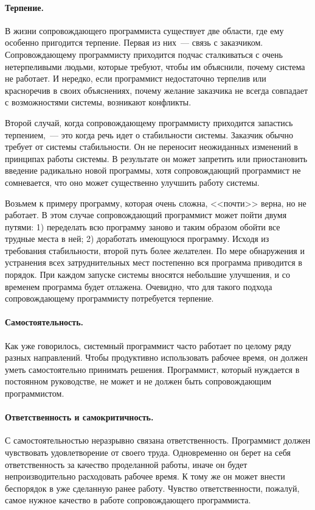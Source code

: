 \documentclass{../../text-style}
\begin{document}
\paragraph{Терпение.} В жизни сопровождающего программиста существует две области, где ему особенно пригодится терпение. Первая из них~--- связь с заказчиком. Сопровождающему программисту приходится подчас сталкиваться с очень нетерпеливыми людьми, которые требуют, чтобы им объяснили, почему система не работает. И нередко, если программист недостаточно терпелив или красноречив в своих объяснениях, почему желание заказчика не всегда совпадает с возможностями системы, возникают конфликты.

Второй случай, когда сопровождающему программисту приходится запастись терпением,~--- это когда речь идет о стабильности системы. Заказчик обычно требует от системы стабильности. Он не переносит неожиданных изменений в принципах работы системы. В результате он может запретить или приостановить введение радикально новой программы, хотя сопровождающий программист не сомневается, что оно может существенно улучшить работу системы. 

Возьмем к примеру программу, которая очень сложна, <<почти>> верна, но не работает. В этом случае сопровождающий программист может пойти двумя путями: 1) переделать всю программу заново и таким образом обойти все трудные места в ней; 2) доработать имеющуюся программу. Исходя из требования стабильности, второй путь более желателен. По мере обнаружения и устранения всех затруднительных мест постепенно вся программа приводится в порядок. При каждом запуске системы вносятся небольшие улучшения, и со временем программа будет отлажена. Очевидно, что для такого подхода сопровождающему программисту потребуется терпение.

\paragraph{Самостоятельность.} Как уже говорилось, системный программист часто работает по целому ряду разных направлений. Чтобы продуктивно использовать рабочее время, он должен уметь самостоятельно принимать решения. Программист, который нуждается в постоянном руководстве, не может и не должен быть сопровождающим программистом.

\paragraph{Ответственность и самокритичность.} С самостоятельностью неразрывно связана ответственность. Программист должен чувствовать удовлетворение от своего труда. Одновременно он берет на себя ответственность за качество проделанной работы, иначе он будет непроизводительно расходовать рабочее время. К тому же он может внести беспорядок в уже сделанную ранее работу. Чувство ответственности, пожалуй, самое нужное качество в работе сопровождающего программиста.
\end{document}

